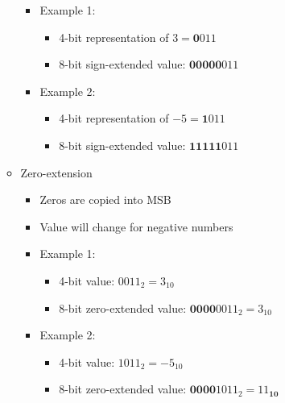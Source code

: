 \documentclass[a4paper]{article}
\begin{document}
\begin{itemize}
\begin{itemize}
\begin{itemize}
\item Example 1:
\begin{itemize}
\item 4-bit representation of $3=\textbf{0}011$
\item 8-bit sign-extended value: $\textbf{00000}011$
\end{itemize}
\item Example 2:
\begin{itemize}
\item 4-bit representation of $-5=\textbf{1}011$
\item 8-bit sign-extended value: $\textbf{11111}011$
\end{itemize}
\end{itemize}
\item Zero-extension
\begin{itemize}
\item Zeros are copied into MSB
\item Value will change for negative numbers
\item Example 1:
\begin{itemize}
\item 4-bit value: $0011_2=3_{10}$
\item 8-bit zero-extended value: $\textbf{0000}0011_2=3_{10}$
\end{itemize}
\item Example 2:
\begin{itemize}
\item 4-bit value: $1011_2=-5_{10}$
\item 8-bit zero-extended value: $\textbf{0000}1011_2=\textbf{$11_{\textbf{10}}$}$
\end{itemize}
\end{itemize}
\end{itemize}
\end{itemize}
\end{document}
